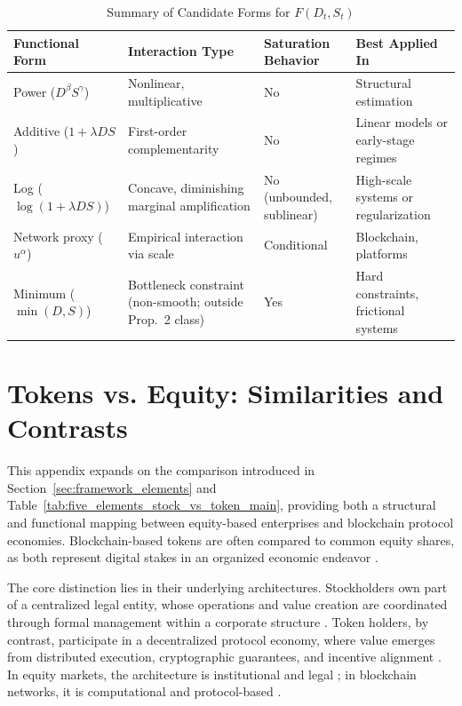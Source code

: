\documentclass[12pt]{article}
\begin{document}
\begin{table}[H]
\centering
\caption{Summary of Candidate Forms for \( F(D_t, S_t) \)}
\label{tab:F_forms_summary}
\renewcommand{\arraystretch}{1.4}
\begin{tabular}{@{}L{3.5cm}L{4.0cm}<{\raggedright}L{3.5cm}L{4.2cm}@{}}
\toprule
{}
\textbf{Functional Form} & \textbf{Interaction Type} & \textbf{Saturation Behavior} & \textbf{Best Applied In} \\
\midrule
Power (\( D^\beta S^\gamma \)) & Nonlinear, multiplicative & No & Structural estimation \\
Additive (\( 1 + \lambda D S \)) & First-order complementarity & No & Linear models or early-stage regimes \\
Log (\( \log(1 + \lambda D S) \)) & Concave, diminishing marginal amplification & No (unbounded, sublinear) & High-scale systems or regularization \\
Network proxy (\( u^\alpha \)) & Empirical interaction via scale & Conditional & Blockchain, platforms \\
Minimum (\( \min(D, S) \)) & Bottleneck constraint (non-smooth; outside Prop.~2 class) & Yes & Hard constraints, frictional systems \\
\bottomrule
\end{tabular}
\end{table}


\newpage
\section{Tokens vs. Equity: Similarities and Contrasts}
\label{appendix:tokens_vs_equity}

This appendix expands on the comparison introduced in Section~\ref{sec:framework_elements} and Table~\ref{tab:five_elements_stock_vs_token_main}, providing both a structural and functional mapping between equity-based enterprises and blockchain protocol economies. Blockchain-based tokens are often compared to common equity shares, as both represent digital stakes in an organized economic endeavor \citep{paech2017governance, yermack2017corporate}. 

The core distinction lies in their underlying architectures. Stockholders own part of a centralized legal entity, whose operations and value creation are coordinated through formal management within a corporate structure \citep{easterbrook1984close, hansmann2001ownership}. Token holders, by contrast, participate in a decentralized protocol economy, where value emerges from distributed execution, cryptographic guarantees, and incentive alignment \citep{gans2019economics, singh2023blockchain, cong2021tokenomics, schar2021defi}. In equity markets, the architecture is institutional and legal \citep{kraakman2017anatomy}; in blockchain networks, it is computational and protocol-based \citep{saleh2021blockchain, biais2020blockchain}. 
\end{document}
